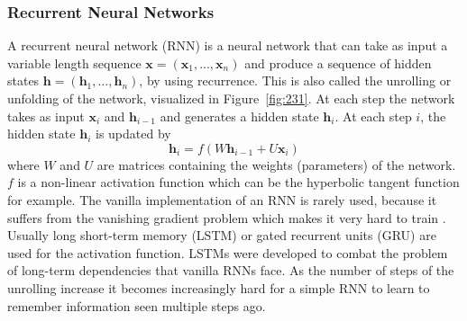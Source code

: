 \documentclass[12pt]{article}
\begin{document}
\subsubsection{Recurrent Neural Networks} \label{sssec:231}
A recurrent neural network (RNN) \cite{RNN:1988} is a neural network that can take as input a variable length sequence \(\bm{x}=(\bm{x}_1,...,\bm{x}_n)\) and produce a sequence of hidden states \(\bm{h}=(\bm{h}_1,...,\bm{h}_n)\), by using recurrence. This is also called the unrolling or unfolding of the network, visualized in Figure~\ref{fig:231}. At each step the network takes as input \(\bm{x}_i\) and \(\bm{h}_{i-1}\) and generates a hidden state \(\bm{h}_i\). At each step \(i\), the hidden state \(\bm{h}_i\) is updated by
\begin{equation} \label{eq231a}
\bm{h}_i=f(W\bm{h}_{i-1}+U\bm{x}_i)
\end{equation}
where \(W\) and \(U\) are matrices containing the weights (parameters) of the network. \(f\) is a non-linear activation function which can be the hyperbolic tangent function for example. The vanilla implementation of an RNN is rarely used, because it suffers from the vanishing gradient problem which makes it very hard to train \cite{Hochreiter:1998}. Usually long short-term memory (LSTM) \cite{Hochreiter:1997} or gated recurrent units (GRU) \cite{Cho:2014} are used for the activation function. LSTMs were developed to combat the problem of long-term dependencies that vanilla RNNs face. As the number of steps of the unrolling increase it becomes increasingly hard for a simple RNN to learn to remember information seen multiple steps ago. 
\end{document}
